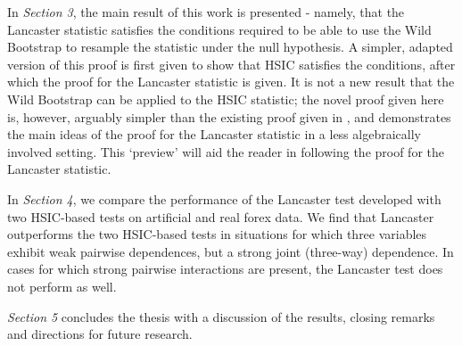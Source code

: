\documentclass[12pt]{article}
\numberwithin{claim}{section}
\numberwithin{lemma}{section}
\numberwithin{theorem}{section}
\begin{document}
In \emph{Section 3}, the main result of this work is presented - namely, that the Lancaster statistic satisfies the conditions required to be able to use the Wild Bootstrap to resample the statistic under the null hypothesis. A simpler, adapted version of this proof is first given to show that HSIC satisfies the conditions, after which the proof for the Lancaster statistic is given. It is not a new result that the Wild Bootstrap can be applied to the HSIC statistic; the novel proof given here is, however, arguably simpler than the existing proof given in \cite{chwialkowski2014wild}, and demonstrates the main ideas of the proof for the Lancaster statistic in a less algebraically involved setting. This `preview' will aid the reader in following the proof for the Lancaster statistic.

In \emph{Section 4}, we compare the performance of the Lancaster test developed with two HSIC-based tests on artificial and real forex data. We find that Lancaster outperforms the two HSIC-based tests in situations for which three variables exhibit weak pairwise dependences, but a strong joint (three-way) dependence. In cases for which strong pairwise interactions are present, the Lancaster test does not perform as well.

\emph{Section 5} concludes the thesis with a discussion of the results, closing remarks and directions for future research.
\end{document}
